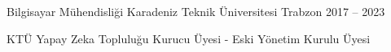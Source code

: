 
\begin{cventries}

  \cventry
    {Bilgisayar Mühendisliği} %
    {Karadeniz Teknik Üniversitesi} %
    {Trabzon} %
    {2017 – 2023} %
    {
      \begin{cvitems}
        \item {KTÜ Yapay Zeka Topluluğu Kurucu Üyesi - Eski Yönetim Kurulu Üyesi}
      \end{cvitems}
    }
\end{cventries}
